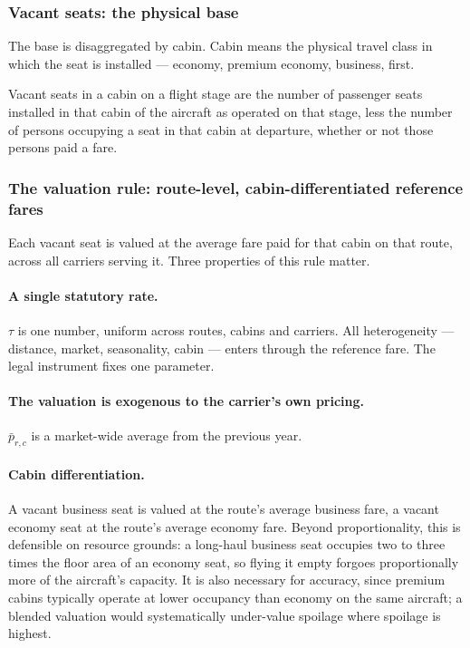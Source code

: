 \documentclass[../../main]{subfiles}
\begin{document}
\subsubsection{Vacant seats: the physical base}
The base is disaggregated by cabin. Cabin means the physical travel class in which the seat is installed --- economy, premium economy, business, first.

Vacant seats in a cabin on a flight stage are the number of passenger seats installed in that cabin of the aircraft as operated on that stage, less the number of persons occupying a seat in that cabin at departure, whether or not those persons paid a fare.


\subsubsection{The valuation rule: route-level, cabin-differentiated reference fares}
Each vacant seat is valued at the average fare paid for that cabin on that route, across all carriers serving it. Three properties of this rule matter.

\paragraph{A single statutory rate.} $\tau$ is one number, uniform across routes, cabins and carriers. All heterogeneity --- distance, market, seasonality, cabin --- enters through the reference fare. The legal instrument fixes one parameter.

\paragraph{The valuation is exogenous to the carrier's own pricing.} $\bar{p}_{r,c}$ is a market-wide average from the previous year. 

\paragraph{Cabin differentiation.} A vacant business seat is valued at the route's average business fare, a vacant economy seat at the route's average economy fare. Beyond proportionality, this is defensible on resource grounds: a long-haul business seat occupies two to three times the floor area of an economy seat, so flying it empty forgoes proportionally more of the aircraft's capacity. It is also necessary for accuracy, since premium cabins typically operate at lower occupancy than economy on the same aircraft; a blended valuation would systematically under-value spoilage where spoilage is highest.
\end{document}
